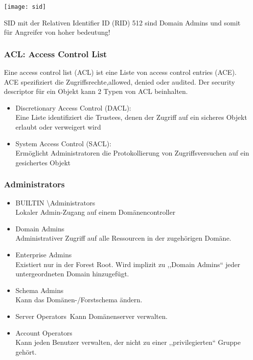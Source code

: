 \begin{center}
    \vspace{-8pt}
    \texttt{[image: sid]}
    \vspace{-8pt}
\end{center}

SID mit der Relativen Identifier ID (RID) 512 sind Domain Admins und somit für Angreifer von hoher bedeutung!

\subsubsection{ACL: Access Control List}
Eine access control list (ACL) ist eine Liste von access control entries (ACE). ACE spezifiziert die Zugriffsrechte,allowed, denied oder audited. Der security descriptor für ein Objekt kann 2 Typen von ACL beinhalten.

\begin{itemize}
    \item Discretionary Access Control (DACL):\\
    Eine Liste identifiziert die Trustees, denen der Zugriff auf ein sicheres Objekt erlaubt oder verweigert wird
    \item System Access Control (SACL):\\
    Ermöglicht Administratoren die Protokollierung von Zugriffsversuchen auf ein gesichertes Objekt
\end{itemize}

\subsubsection{Administrators}
\begin{itemize}
    \item BUILTIN \textbackslash Administrators\\
    Lokaler Admin-Zugang auf einem Domänencontroller
    \item Domain Admins\\
    Administrativer Zugriff auf alle Ressourcen in der zugehörigen Domäne.
    \item Enterprise Admins\\
    Existiert nur in der Forest Root. Wird implizit zu ,,Domain Admins`` jeder untergeordneten Domain hinzugefügt.
    \item Schema Admins\\
    Kann das Domänen-/Forstschema ändern.
    \item Server Operators\
    Kann Domänenserver verwalten.
    \item Account Operators\\
    Kann jeden Benutzer verwalten, der nicht zu einer ,,privilegierten`` Gruppe gehört.
\end{itemize}

